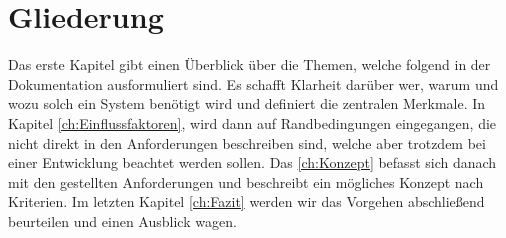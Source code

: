 \section{Gliederung}
Das erste Kapitel gibt einen Überblick über die Themen, welche folgend in der Dokumentation ausformuliert sind. Es schafft Klarheit darüber wer, warum und wozu solch ein System benötigt wird und definiert die zentralen Merkmale.  In Kapitel \ref{ch:Einflussfaktoren}, wird dann auf Randbedingungen eingegangen, die nicht direkt in den Anforderungen beschreiben sind, welche aber trotzdem bei einer Entwicklung beachtet werden sollen. Das \ref{ch:Konzept} befasst sich danach mit den gestellten Anforderungen und beschreibt ein mögliches Konzept nach Kriterien. Im letzten Kapitel \ref{ch:Fazit} werden wir das Vorgehen abschließend beurteilen und einen Ausblick wagen.